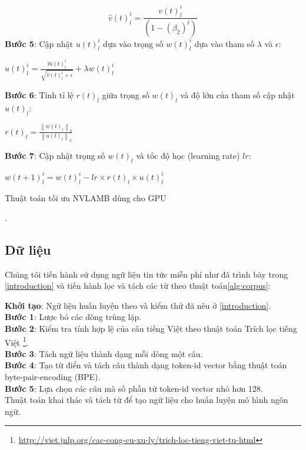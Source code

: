 \documentclass[10pt, conference, a4paper, compsocconf]{IEEEtran}
\begin{document}
\begin{algorithm}[!ht]
\begin{equation}
   \end{equation}
   \begin{equation}
    \widehat{v}(t)_{l}^{i}=\frac{v(t)_{l}^{i}}{\left(1-\left(\beta_{2}\right)^{t}\right)}
   \end{equation}
   \textbf{Bước 5}: Cập nhật $u(t)_{l}^{i}$ dựa vào trọng số $w(t)_{l}^{i}$ dựa vào tham số $\lambda$ và $\epsilon$:
   \begin{center}
    $u(t)_{l}^{i}=\frac{\widehat{m}(t)_{l}^{i}}{\sqrt{\widehat{v}(t)_{l}^{i}+\epsilon}}+\lambda w(t)_{l}^{i}$
   \end{center}
   \textbf{Bước 6}: Tính tỉ lệ $r(t)_{l}$ giữa trọng số $w(t)_{l}$ và độ lớn của tham số cập nhật $u(t)_{l}$:
   \begin{center}
    $r(t)_{l}=\frac{\left\|w(t)_{l}\right\|_{2}}{\left\|u(t)_{l}\right\|_{2}}$
   \end{center}
   \textbf{Bước 7}: Cập nhật trọng số $w(t)_{l}$ và tốc độ học (learning rate) $lr$:
   \begin{center}
    $w(t+1)_{l}^{i}=w(t)_{l}^{i}- lr \times r(t)_{l} \times u(t)_{l}^{i}$
   \end{center}
   \caption{Thuật toán tối ưu NVLAMB dùng cho GPU}.
   \label{alg:nvlamb}
  \end{algorithm}
\subsection{Dữ liệu}
\label{dataset}
Chúng tôi tiến hành sử dụng ngữ liệu tin tức miễn phí như đã trình bày trong \ref{introduction} và 
tiến hành lọc và tách các từ theo thuật toán\ref{alg:corpus}:
\begin{algorithm}[!ht]
  \SetAlgoLined
   \textbf{Khởi tạo}: Ngữ liệu huấn luyện theo và kiểm thử đã nêu ở \ref{introduction}.\\
   \textbf{Bước 1}: Lược bỏ các dòng trùng lặp.\\
   \textbf{Bước 2}: Kiểm tra tính hợp lệ của câu tiếng Việt theo thuật toán Trích lọc tiếng Việt
   \footnote{\url{http://viet.jnlp.org/cac-cong-cu-xu-ly/trich-loc-tieng-viet-tu-html}}.\\
   \textbf{Bước 3}: Tách ngữ liệu thành dạng mỗi dòng một câu.\\
   \textbf{Bước 4}: Tạo từ điển và tách câu thành dạng token-id vector bằng thuật toán byte-pair-encoding (BPE)\cite{Sennrich2015}.\\
   \textbf{Bước 5}: Lựa chọn các câu mà số phần tử token-id vector nhỏ hơn 128.\\
   \caption{Thuật toán khai thác và tách từ để tạo ngữ liệu cho huấn luyện mô hình ngôn ngữ.}
   \label{alg:corpus}
  \end{algorithm}
\end{document}
